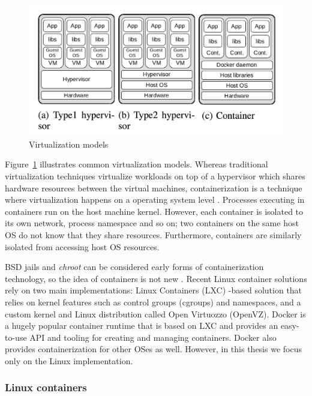 \documentclass[english, 12pt, a4paper, sci, utf8, a-2b, online]{aaltothesis}
\begin{document}
\begin{figure}[h!]
  \centering
  \includegraphics[width=\linewidth]{files/figure-1.png}
  \caption{Virtualization models \cite{combe2016docker}}
  \label{figure-1}
\end{figure}

Figure~\ref{figure-1} illustrates common virtualization models. Whereas traditional virtualization techniques virtualize workloads on top of a hypervisor which shares hardware resources between the virtual machines, containerization is a technique where virtualization happens on a operating system level \cite{merkel2014docker}. Processes executing in containers run on the host machine kernel. However, each container is isolated to its own network, process namespace and so on; two containers on the same host OS do not know that they share resources. Furthermore, containers are similarly isolated from accessing host OS resources.

BSD jails and \textit{chroot} can be considered early forms of containerization technology, so the idea of containers is not new \cite{combe2016docker}. Recent Linux container solutions rely on two main implementations: Linux Containers (LXC) -based solution that relies on kernel features such as control groups (cgroups) and namespaces, and a custom kernel and Linux distribution called Open Virtuozzo (OpenVZ). Docker \cite{docker} is a hugely popular container runtime that is based on LXC and provides an easy-to-use API and tooling for creating and managing containers. Docker also provides containerization for other OSes as well. However, in this thesis we focus only on the Linux implementation.

\subsubsection{Linux containers}
\end{document}
